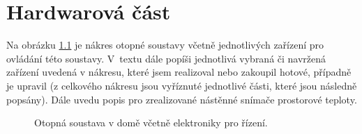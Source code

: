 \chapter{Hardwarová část}

Na obrázku \ref{fig:otopna-soustava-a-elektronika-rez-domu} je nákres otopné soustavy včetně jednotlivých zařízení pro ovládání této soustavy. V~textu dále popíši jednotlivá vybraná či navržená zařízení uvedená v nákresu, které jsem realizoval nebo zakoupil hotové, případně je upravil (z celkového nákresu jsou vyříznuté jednotlivé části, které jsou následně popsány). Dále uvedu popis pro zrealizované nástěnné snímače prostorové teploty.

\newpage

\begin{figure}[H]
    \centering
    \def\svgwidth{\columnwidth}
    
    \caption{Otopná soustava v domě včetně elektroniky pro řízení.}
    \label{fig:otopna-soustava-a-elektronika-rez-domu}
\end{figure}


























